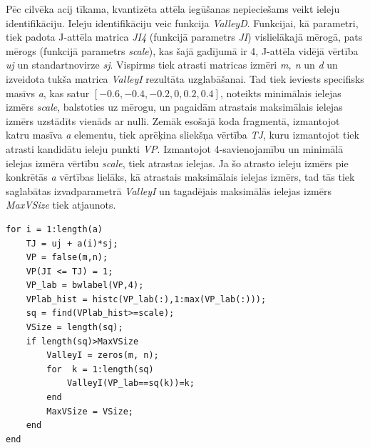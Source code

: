 \documentclass[12pt,paper=a4]{report}
\begin{document}
Pēc cilvēka acij tīkama, kvantizēta attēla iegūšanas nepieciešams veikt ieleju identifikāciju. Ieleju identifikāciju veic funkcija \textit{ValleyD}. Funkcijai, kā parametri, tiek padota J-attēla matrica \textit{JI4} (funkcijā parametrs \textit{JI}) vislielākajā mērogā, pats mērogs (funkcijā parametrs \textit{scale}), kas šajā gadījumā ir 4, J-attēla vidējā vērtība \textit{uj} un standartnovirze \textit{sj}. Vispirms tiek atrasti matricas izmēri \textit{m, n} un \textit{d} un izveidota tukša matrica \textit{ValleyI} rezultāta uzglabāšanai. Tad tiek ieviests specifisks masīvs \textit{a}, kas satur $[-0.6, -0.4, -0.2, 0, 0.2, 0.4]$, noteikts minimālais ielejas izmērs \textit{scale}, balstoties uz mērogu, un pagaidām atrastais maksimālais ielejas izmērs uzstādīts vienāds ar nulli. Zemāk esošajā koda fragmentā, izmantojot katru masīva \textit{a} elementu, tiek aprēķina sliekšņa vērtība \textit{TJ}, kuru izmantojot tiek atrasti kandidātu ieleju punkti \textit{VP}. Izmantojot 4-savienojamību un minimālā ielejas izmēra vērtību \textit{scale}, tiek atrastas ielejas. Ja šo atrasto ieleju izmērs pie konkrētās \textit{a} vērtības lielāks, kā atrastais maksimālais ielejas izmērs, tad tās tiek saglabātas izvadparametrā \textit{ValleyI} un tagadējais maksimālās ielejas izmērs \textit{MaxVSize} tiek atjaunots.
\begin{lstlisting}
for i = 1:length(a)
	TJ = uj + a(i)*sj;
	VP = false(m,n);
	VP(JI <= TJ) = 1;
	VP_lab = bwlabel(VP,4);
	VPlab_hist = histc(VP_lab(:),1:max(VP_lab(:)));
	sq = find(VPlab_hist>=scale);
	VSize = length(sq);
	if length(sq)>MaxVSize
		ValleyI = zeros(m, n);
		for  k = 1:length(sq)
			ValleyI(VP_lab==sq(k))=k;
		end
		MaxVSize = VSize;
	end   
end
\end{lstlisting}\par
\end{document}
